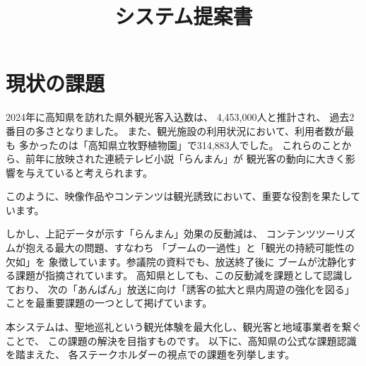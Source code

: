 \documentclass{docs}
\title{システム提案書}
\begin{document}
\section{現状の課題}\label{sec:issues}
2024年に高知県を訪れた県外観光客入込数は、%
4,453,000人と推計され、%
過去2番目の多さとなりました。
また、観光施設の利用状況において、利用者数が最も
多かったのは「高知県立牧野植物園」で314,883人でした\cite{kochi_tourism_stat}。
これらのことから、前年に放映された連続テレビ小説「らんまん」が
観光客の動向に大きく影響を与えていると考えられます。

このように、映像作品やコンテンツは観光誘致において、重要な役割を果たしています。

しかし、上記データが示す「らんまん」効果の反動減は、
コンテンツツーリズムが抱える最大の問題、すなわち
「ブームの一過性」と「観光の持続可能性の欠如」を
象徴しています。参議院の資料\cite{sangiin2012}でも、放送終了後に
ブームが沈静化する課題が指摘されています。
高知県としても、この反動減を課題として認識しており、
次の「あんぱん」放送に向け「誘客の拡大と県内周遊の強化を図る」
ことを最重要課題の一つとして掲げています\cite{kochi_r7_plan}。

本システムは、聖地巡礼という観光体験を最大化し、観光客と地域事業者を繋ぐことで、
この課題の解決を目指すものです。
以下に、高知県の公式な課題認識\cite{kochi_dx_plan}を踏まえた、
各ステークホルダーの視点での課題を列挙します。
\end{document}
